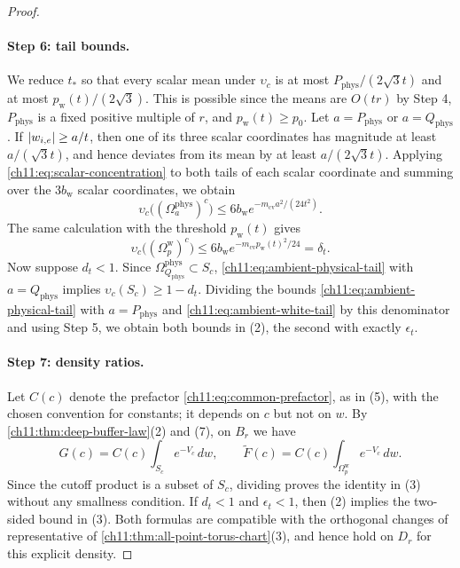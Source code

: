 \begin{proof}
\paragraph{Step 6: tail bounds.}
We reduce $t_*$ so that every scalar mean under $\upsilon_c$ is at most $P_{\mathrm{phys}}/(2\sqrt3t)$ and at most $p_{\mathrm w}(t)/(2\sqrt3)$. This is possible since the means are $O(tr)$ by Step 4, $P_{\mathrm{phys}}$ is a fixed positive multiple of $r$, and $p_{\mathrm w}(t)\ge p_0$. Let $a=P_{\mathrm{phys}}$ or $a=Q_{\mathrm{phys}}$. If $\lvert w_{i,e}\rvert\ge a/t$, then one of its three scalar coordinates has magnitude at least $a/(\sqrt3t)$, and hence deviates from its mean by at least $a/(2\sqrt3t)$. Applying \eqref{ch11:eq:scalar-concentration} to both tails of each scalar coordinate and summing over the $3b_{\mathrm w}$ scalar coordinates, we obtain
\begin{equation}\label{ch11:eq:ambient-physical-tail}
 \upsilon_c\bigl((\Omega_a^{\mathrm{phys}})^c\bigr)\le6b_{\mathrm w}e^{-m_{\mathrm{cv}}a^2/(24t^2)}.
\end{equation}
The same calculation with the threshold $p_{\mathrm w}(t)$ gives
\begin{equation}\label{ch11:eq:ambient-white-tail}
 \upsilon_c\bigl((\Omega_p^{\mathrm w})^c\bigr)\le6b_{\mathrm w}e^{-m_{\mathrm{cv}}p_{\mathrm w}(t)^2/24}=\delta_t.
\end{equation}
Now suppose $d_t<1$. Since $\Omega_{Q_{\mathrm{phys}}}^{\mathrm{phys}}\subset S_c$, \eqref{ch11:eq:ambient-physical-tail} with $a=Q_{\mathrm{phys}}$ implies $\upsilon_c(S_c)\ge1-d_t$. Dividing the bounds \eqref{ch11:eq:ambient-physical-tail} with $a=P_{\mathrm{phys}}$ and \eqref{ch11:eq:ambient-white-tail} by this denominator and using Step 5, we obtain both bounds in (2), the second with exactly $\epsilon_t$.

\paragraph{Step 7: density ratios.}
Let $C(c)$ denote the prefactor \eqref{ch11:eq:common-prefactor}, as in (5), with the chosen convention for constants; it depends on $c$ but not on $w$. By \cref{ch11:thm:deep-buffer-law}(2) and (7), on $B_r$ we have
\[
 G(c)=C(c)\int_{S_c}e^{-V_c}\,dw,\qquad
 \widetilde F(c)=C(c)\int_{\Omega_p^{\mathrm w}}e^{-V_c}\,dw.
\]
Since the cutoff product is a subset of $S_c$, dividing proves the identity in (3) without any smallness condition. If $d_t<1$ and $\epsilon_t<1$, then (2) implies the two-sided bound in (3). Both formulas are compatible with the orthogonal changes of representative of \cref{ch11:thm:all-point-torus-chart}(3), and hence hold on $D_r$ for this explicit density.


\end{proof}
